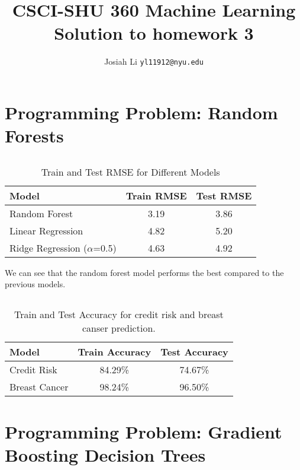 \documentclass{article}
\title{CSCI-SHU 360 Machine Learning\\
    Solution to homework 3}
\author{Josiah Li \texttt{yl11912@nyu.edu}}
\begin{document}
    \maketitle
\section{Programming Problem: Random Forests}
\subsection{}
\begin{table}[ht]
  \centering
  \caption{Train and Test RMSE for Different Models}
  \label{tab:rmse-comparison}
  \begin{tabular}{lcc}
    \toprule
    \textbf{Model}            & \textbf{Train RMSE} & \textbf{Test RMSE} \\
    \midrule
    Random Forest             & 3.19                & 3.86               \\
    Linear Regression         & 4.82                & 5.20               \\
    Ridge Regression ($\alpha$=0.5) & 4.63            & 4.92               \\
    \bottomrule
  \end{tabular}
\end{table}
We can see that the random forest model performs the best compared to the previous models. 
\subsection{}
\begin{table}[ht]
  \centering
  \caption{Train and Test Accuracy for credit risk and breast canser prediction.}
  \label{tab:rmse-comparison}
  \begin{tabular}{lcc}
    \toprule
    \textbf{Model}            & \textbf{Train Accuracy} & \textbf{Test Accuracy} \\
    \midrule
    Credit Risk               & 84.29\%                & 74.67\%               \\
    Breast Cancer         & 98.24\%               & 96.50\%               \\
    \bottomrule
  \end{tabular}
\end{table}

\section{Programming Problem: Gradient Boosting Decision Trees}
\end{document}

